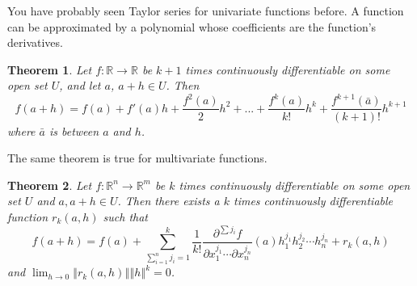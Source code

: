 \documentclass[12pt,reqno]{amsart}
\newtheorem{theorem}{Theorem}[section]
\theoremstyle{definition}
\def\R{\mathbb{R}}
\newcommand{\norm}[1]{\left\Vert {#1} \right\Vert}
\renewcommand{\to}{{\rightarrow}}
\begin{document}
You have probably seen Taylor series for univariate functions
before. A function can be approximated by a polynomial whose
coefficients are the function's derivatives. 
\begin{theorem}
  Let $f: \R \to \R$ be $k+1$ times continuously differentiable on some
  open set $U$, and let $a$, $a+h \in U$. Then 
  \[ f(a+h) = f(a) + f'(a) h + \frac{f^2(a)}{2} h^2 + ... +
  \frac{f^k(a)}{k!} h^k + \frac{f^{k+1}(\bar{a})}{(k+1)!} h^{k+1}
  \]
  where $\bar{a}$ is between $a$ and $h$. 
\end{theorem}
The same theorem is true for multivariate functions.
\begin{theorem}
  Let $f:\R^n \to \R^m$ be $k$ times continuously differentiable on
  some open set $U$ and $a, a+h \in U$. Then there exists a $k$ times
  continuously differentiable function $r_k(a,h)$ such that
  \[ f(a+h) = f(a) + \sum_{\sum_{i=1}^n {j_i}=1}^k\frac{1}{k!}
  \frac{\partial^{\sum j_i} f}{\partial x_{1}^{j_1} \cdots \partial
    x_{n}^{j_n}}(a) h_1^{j_1}h_2^{j_2} \cdots h_n^{j_n} + r_k(a,h) \]
  and $\lim_{h \to 0} \norm{r_k(a,h)}{\norm{h}^k} = 0$.
\end{theorem}
\end{document}
